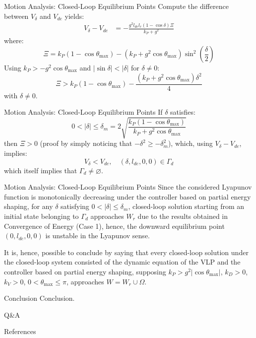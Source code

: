 \documentclass[10pt]{beamer}
\begin{document}
	\begin{frame}{Motion Analysis: Closed-Loop Equilibrium Points}
		Compute the difference between $V_\delta$ and $V_{de}$ yields:
    \begin{align*}
      V_\delta - V_{de} %
        &= -\frac{g^2 l_{de} l_r (1-\cos\delta) \Xi}{k_P+g^2}
    \end{align*}
    where:
    \begin{equation*}
        \Xi = k_P(1-\cos\theta_{\max})-(k_P+g^2\cos\theta_{\max})
            \sin^2 \left( \frac{\delta}{2} \right)
    \end{equation*}
    Using $k_P > -g^2\cos\theta_{\max}$ and
    $|\sin \delta|<|\delta|$ for $\delta \neq 0$:
    \begin{equation*}
      \Xi > k_P(1-\cos\theta_{\max})-
        \frac{(k_P+g^2\cos\theta_{\max})\delta^2}{4}
    \end{equation*}
    with $\delta \neq 0$.
	\end{frame}

	\begin{frame}{Motion Analysis: Closed-Loop Equilibrium Points}
		If $\delta$ satisfies:
    \begin{equation*}
      0 < |\delta| \le \delta_m = 2
        \sqrt{\frac{k_P(1-\cos\theta_{\max})}{k_P+g^2\cos\theta_{\max}}}
    \end{equation*}
    then $\Xi>0$ (proof by simply noticing that $-\delta^2\ge-\delta_m^2$),
    which, using $V_\delta - V_{de}$, implies:
    \begin{equation*}
      V_\delta < V_{de}, \quad (\delta, l_{de}, 0, 0) \in \Gamma_d
    \end{equation*}
    which itself implies%
    that $\Gamma_d \neq \varnothing$.
	\end{frame}

	\begin{frame}{Motion Analysis: Closed-Loop Equilibrium Points}
		Since the considered Lyapunov function is
    monotonically decreasing under the controller
		based on partial energy shaping, for any $\delta$
    satisfying $0 < |\delta| \le \delta_m$, closed-loop solution
    starting from an initial state belonging to $\Gamma_d$
    approaches $W_r$ due to the results obtained in
    Convergence of Energy (Case 1),
    hence, the downward
    equilibrium point $(0, l_{de}, 0, 0)$ is unstable in the
    Lyapunov sense.

    It is, hence, possible to conclude by saying that
    every closed-loop solution under the closed-loop
    system consisted of the dynamic equation of the VLP and the controller
    based on partial energy shaping, supposing
    $k_P>g^2|\cos\theta_{\max}|$, $k_D>0$, $k_V>0$,
    $0<\theta_{\max}\le\pi$, approaches $W=W_r\cup\Omega$.
	\end{frame}

  \begin{frame}{Conclusion}
    Conclusion.
  \end{frame}

  \begin{frame}[standout]
  	Q\&A
  \end{frame}

  \appendix

  \begin{frame}{References}
  	
    
  \end{frame}
\end{document}
